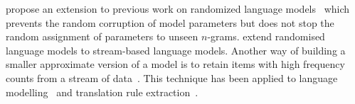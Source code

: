 
\citet{guthrie-hepple:2010:EMNLP} propose an extension to previous work
on randomized language models~\citep{talbot-osborne:2007:EMNLP-CoNLL} which prevents
the random corruption of model parameters but does not stop the random
assignment of parameters to unseen $n$-grams.
\citet{levenberg-osborne:2009:EMNLP} extend randomised language models to
stream-based language models. Another way of building a smaller approximate
version of a model is to retain items with high frequency counts from a stream
of data~\citep{manku-motwani:2002:VLDB}. This technique has been applied to
language modelling~\citep{goyal-daumeiii-venkatasubramanian:2009:NAACL} and
translation rule extraction~\citep{przywara-bojar:2011:PBML}. 




